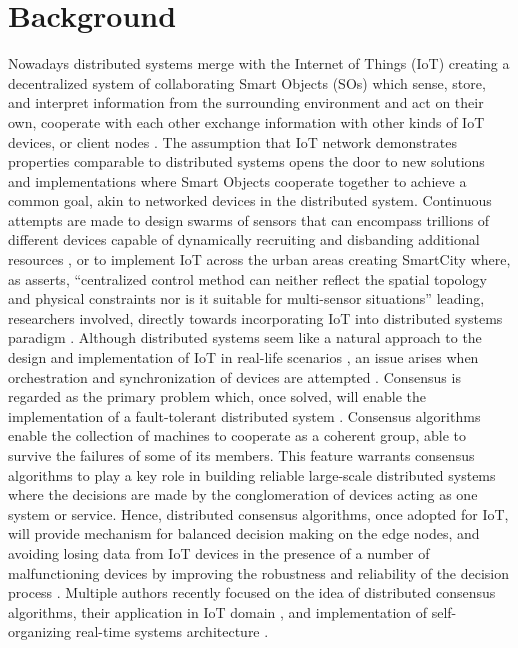 \documentclass[oneside,12pt]{book}
\begin{document}
\section{Background}
\par Nowadays distributed systems merge with the Internet of Things (IoT) creating a decentralized system of collaborating Smart Objects (SOs) which sense, store, and interpret information from the surrounding environment and act on their own, cooperate with each other exchange information with other kinds of IoT devices, or client nodes \citep{7488250}.\smallskip \newline 
The assumption that IoT network demonstrates properties comparable to distributed systems \citep{ICAR} opens the door to new solutions and implementations where Smart Objects cooperate together to achieve a common goal, akin to networked devices in the distributed system. Continuous attempts are made to design swarms of sensors that can encompass trillions of different devices capable of dynamically recruiting and disbanding additional resources \citep{6781658}, or to implement IoT across the urban areas creating SmartCity where, as \cite{JI2021101182} asserts, “centralized control method can neither reflect the spatial topology and physical constraints nor is it suitable for multi-sensor situations” leading, researchers involved, directly towards incorporating IoT into distributed systems paradigm \citep{XIAOYI2021106567}.\smallskip \newline    
Although distributed systems seem like a natural approach to the design and implementation of IoT in real-life scenarios \citep{CHAMOSO2020323}, an issue arises when orchestration and synchronization of devices are attempted \citep{AHMAD2020482}. Consensus is regarded as the primary problem which, once solved, will enable the implementation of a fault-tolerant distributed system \citep{MSR-TR-2005-33}. Consensus algorithms enable the collection of machines to cooperate as a coherent group, able to survive the failures of some of its members. This feature warrants consensus algorithms to play a key role in building reliable large-scale distributed systems \citep{10.5555/2643634.2643666} where the decisions are made by the conglomeration of devices acting as one system or service. Hence, distributed consensus algorithms, once adopted for IoT, will provide mechanism for balanced decision making on the edge nodes, and avoiding losing data from IoT devices in the presence of a number of malfunctioning devices by improving the robustness and reliability of the decision process \citep{6740862}.\smallskip \newline
Multiple authors recently focused on the idea of distributed consensus algorithms, their application in IoT domain \citep{BOF2017601,RAGHAV2020101291,whittaker2020matchmaker,ZHANG2020574,FORTINO202034}, and implementation of self-organizing real-time systems architecture \citep{10.1007/978-3-030-30278-8_34,GUERRERO2019131,7488250}.
\end{document}
